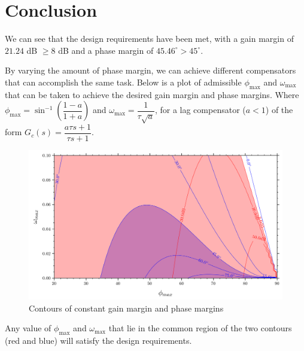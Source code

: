 \documentclass[12pt]{article}
\begin{document}
\section{Conclusion}
We can see that the design requirements have been met, with a gain margin of
$21.24$ dB $\geq 8$ dB and a phase margin of $45.46^\circ > 45^\circ$.

By varying the amount of phase margin, we can achieve different compensators
that can accomplish the same task. Below is a plot of admissible
$\phi_{\text{max}}$ and $\omega_{\text{max}}$ that can be taken to achieve the
desired gain margin and phase margins. Where $\phi_{\text{max}} =
    \sin^{-1}\left(\dfrac{1-a}{1+a}\right)$ and $\omega_{\text{max}} =
    \dfrac{1}{\tau\sqrt{a}}$, for a lag compensator ($a<1$) of the form $G_c(s) =
    \dfrac{a\tau s+1}{\tau s+1}$.

\begin{figure}[h!]
    \centering
    \includegraphics[width=0.8\linewidth]{contour_gm_pm.png}
    \caption {Contours of constant gain margin and phase margins}
    \label{fig:countour}
\end{figure}

Any value of $\phi_{\text{max}}$ and $\omega_{\text{max}}$ that lie in the
common region of the two contours (red and blue) will satisfy the design
requirements.
\end{document}

